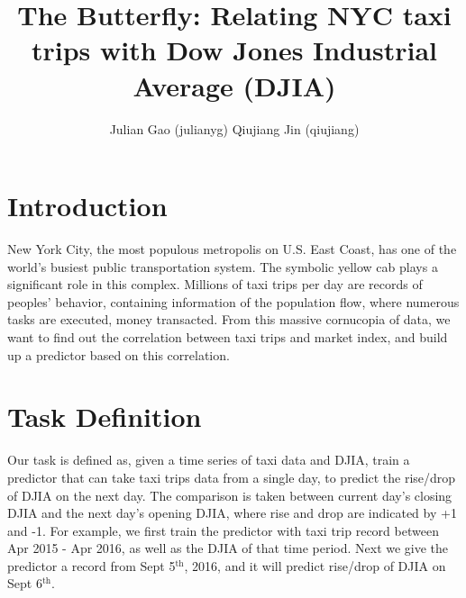 \documentclass[a4paper]{article}
\title{The Butterfly: Relating NYC taxi trips with Dow Jones Industrial Average (DJIA)}
\author{Julian Gao (julianyg) Qiujiang Jin (qiujiang)}
\begin{document}
\maketitle
\section{Introduction}
New York City, the most populous metropolis on U.S. East Coast, has one of the world's busiest public transportation system. The symbolic yellow cab plays a significant role in this complex. Millions of taxi trips per day are records of peoples' behavior, containing information of the population flow, where numerous tasks are executed, money transacted.  From this massive cornucopia of data, we want to find out the correlation between taxi trips and market index, and build up a predictor based on this correlation.
\section{Task Definition}
Our task is defined as, given a time series of taxi data and DJIA, train a predictor that can take taxi trips data from a single day, to predict the rise/drop of DJIA on the next day. The comparison is taken between current day's closing DJIA and the next day's opening DJIA, where rise and drop are indicated by +1 and -1. For example, we first train the predictor with taxi trip record between Apr 2015 - Apr 2016, as well as the DJIA of that time period. Next we give the predictor a record from Sept 5$^{\text{th}}$, 2016, and it will predict rise/drop of DJIA on Sept 6$^{\text{th}}$.
\end{document}
